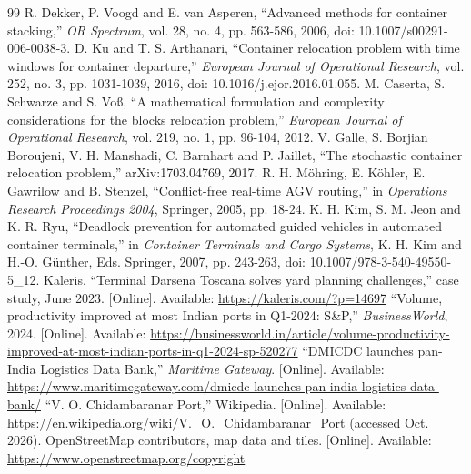 \documentclass[conference]{IEEEtran}
\begin{document}
\begin{thebibliography}{99}
 R. Dekker, P. Voogd and E. van Asperen, ``Advanced methods for container stacking,'' \emph{OR Spectrum}, vol. 28, no. 4, pp. 563-586, 2006, doi: 10.1007/s00291-006-0038-3.
 D. Ku and T. S. Arthanari, ``Container relocation problem with time windows for container departure,'' \emph{European Journal of Operational Research}, vol. 252, no. 3, pp. 1031-1039, 2016, doi: 10.1016/j.ejor.2016.01.055.
 M. Caserta, S. Schwarze and S. Vo{\ss}, ``A mathematical formulation and complexity considerations for the blocks relocation problem,'' \emph{European Journal of Operational Research}, vol. 219, no. 1, pp. 96-104, 2012.
 V. Galle, S. Borjian Boroujeni, V. H. Manshadi, C. Barnhart and P. Jaillet, ``The stochastic container relocation problem,'' arXiv:1703.04769, 2017.
 R. H. M\"ohring, E. K\"ohler, E. Gawrilow and B. Stenzel, ``Conflict-free real-time AGV routing,'' in \emph{Operations Research Proceedings 2004}, Springer, 2005, pp. 18-24.
 K. H. Kim, S. M. Jeon and K. R. Ryu, ``Deadlock prevention for automated guided vehicles in automated container terminals,'' in \emph{Container Terminals and Cargo Systems}, K. H. Kim and H.-O. G\"unther, Eds. Springer, 2007, pp. 243-263, doi: 10.1007/978-3-540-49550-5\_12.
 Kaleris, ``Terminal Darsena Toscana solves yard planning challenges,'' case study, June 2023. [Online]. Available: \url{https://kaleris.com/?p=14697}
 ``Volume, productivity improved at most Indian ports in Q1-2024: S\&P,'' \emph{BusinessWorld}, 2024. [Online]. Available: \url{https://businessworld.in/article/volume-productivity-improved-at-most-indian-ports-in-q1-2024-sp-520277}
 ``DMICDC launches pan-India Logistics Data Bank,'' \emph{Maritime Gateway}. [Online]. Available: \url{https://www.maritimegateway.com/dmicdc-launches-pan-india-logistics-data-bank/}
 ``V. O. Chidambaranar Port,'' Wikipedia. [Online]. Available: \url{https://en.wikipedia.org/wiki/V._O._Chidambaranar_Port} (accessed Oct. 2026).
 OpenStreetMap contributors, map data and tiles. [Online]. Available: \url{https://www.openstreetmap.org/copyright}
\end{thebibliography}
\end{document}
